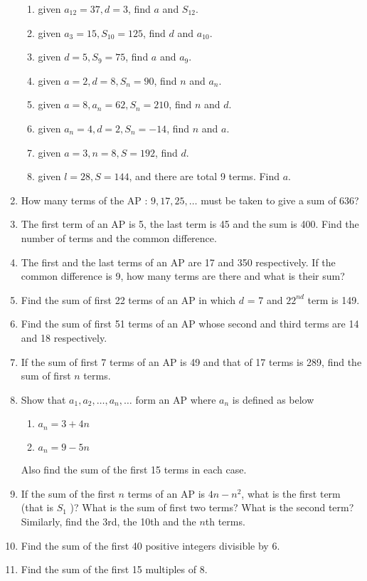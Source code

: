 \begin{enumerate}[label=\thesubsection.\arabic*, ref=\thesubsection.\theenumi]
\begin{enumerate}
\item  given $a_{12} = 37,  d = 3$,  find $a$ and $S_{12}$.
\item given $a_3 = 15,  S_{10} = 125$,  find $d$ and $a_{10}$.
\item given $d = 5,  S_9= 75$,  find $a$ and $a_9$.
\item given $a = 2,  d = 8,  S_n = 90$,  find $n$ and $a_n$.
\item  given $a = 8,  a_n = 62,  S_n = 210$,  find $n$ and $d$.
\item given $a_n = 4,  d = 2,  S_n = -14$,  find $n$ and $a$.
\item given $a = 3,  n = 8,  S = 192$,  find $d$.
\item given $l = 28,  S = 144$,  and there are total 9 terms. Find $a$.
\end{enumerate}
\item How many terms of the AP : $9,  17,  25,  \dots $ must be taken to give a sum of 636?
\item The first term of an AP is 5,  the last term is 45 and the sum is 400. Find the number of terms and the common difference.
\item The first and the last terms of an AP are 17 and 350 respectively. If the common difference is 9,  how many terms are there and what is their sum?
\item Find the sum of first 22 terms of an AP in which $d$ = 7 and $22^{nd}$ term is 149.
\item Find the sum of first 51 terms of an AP whose second and third terms are 14 and 18 respectively.
\item If the sum of first 7 terms of an AP is 49 and that of 17 terms is 289,  find the sum of first $n$ terms. 
\item Show that $a_1 ,  a_2 ,  \dots,  a_n,  \dots$  form an AP where $a_n$ is defined as below 
\begin{enumerate}
	\item $a_n = 3 + 4n$
	\item $a_n = 9 - 5n$
\end{enumerate}
Also find the sum of the first 15 terms in each case.
\item If the sum of the first $n$ terms of an AP is $4n - n^2$,  what is the first term (that is $S_1$ )? What
is the sum of first two terms? What is the second term? Similarly,  find the 3rd,  the 10th and
the $n$th terms.
\item Find the sum of the first 40 positive integers divisible by 6.
\item Find the sum of the first 15 multiples of 8.

\end{enumerate}
